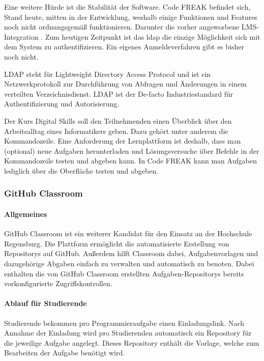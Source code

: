 Eine weitere Hürde ist die Stabilität der Software. Code FREAK befindet sich,
Stand heute, mitten in der Entwicklung, weshalb einige Funktionen und Features
noch nicht ordnungsgemäß funktionieren. Darunter die vorher angeworbene
LMS-Integration \parencite{codefreak-docs}. Zum heutigen Zeitpunkt ist das
\ac{ldap} die einzige Möglichkeit sich mit dem System zu authentifizieren. Ein
eigenes Anmeldeverfahren gibt es bisher noch nicht.

LDAP steht für Lightweight Directory Access Protocol und ist ein
Netzwerkprotokoll zur Durchführung von Abfragen und Änderungen in einem 
verteilten Verzeichnisdienst. LDAP ist der De-facto Industriestandard für
Authentifizierung und Autorisierung. \parencite{ldap}

Der Kurs Digital Skills soll den Teilnehmenden einen Überblick über den
Arbeitsalltag eines Informatikers geben. Dazu gehört unter anderem die
Kommandozeile. Eine Anforderung der Lernplattform ist deshalb, dass man
(optional) neue Aufgaben herunterladen und Lösungsversuche über Befehle in der
Kommandozeile testen und abgeben kann. In Code FREAK kann man Aufgaben lediglich
über die Oberfläche testen und abgeben.

\newpage
\subsubsection{GitHub Classroom}
\paragraph{Allgemeines}
GitHub Classroom ist ein weiterer Kandidat für den Einsatz an der
Hochschule Regensburg. Die Plattform ermöglicht die automatisierte
Erstellung von Repositorys auf GitHub. Außerdem hilft Classroom dabei,
Aufgabenvorlagen und dazugehörige Abgaben einfach zu verwalten und automatisch
zu benoten. Dabei enthalten die von GitHub Classroom erstellten
Aufgaben-Repositorys bereits vorkonfigurierte Zugriffskontrollen. \parencite{github-classroom-startseite}

\paragraph{Ablauf für Studierende}
Studierende bekommen pro Programmieraufgabe einen Einladungslink. Nach Annahme
der Einladung wird pro Studierenden automatisch ein Repository für die jeweilige
Aufgabe angelegt. Dieses Repository enthält die Vorlage, welche zum Bearbeiten
der Aufgabe benötigt wird.

